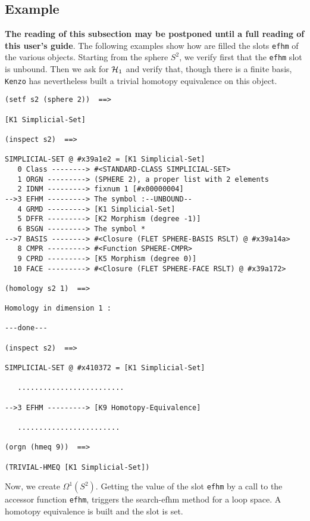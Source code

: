 \subsection*{Example}

{\bf The reading of this subsection may be postponed until a full reading of this user's guide}.
The following examples  show how are
filled the slots {\tt efhm} of the various objects.
Starting from the sphere $S^2$, we  verify first that the {\tt efhm} slot is unbound.
Then we ask for ${\cal H}_1$ and verify that, though there is a finite basis,
{\tt Kenzo} has nevertheless built a trivial homotopy equivalence on this object.
{\footnotesize\begin{verbatim}
(setf s2 (sphere 2))  ==>

[K1 Simplicial-Set]

(inspect s2)  ==>

SIMPLICIAL-SET @ #x39a1e2 = [K1 Simplicial-Set]
   0 Class --------> #<STANDARD-CLASS SIMPLICIAL-SET>
   1 ORGN ---------> (SPHERE 2), a proper list with 2 elements
   2 IDNM ---------> fixnum 1 [#x00000004]
-->3 EFHM ---------> The symbol :--UNBOUND--
   4 GRMD ---------> [K1 Simplicial-Set]
   5 DFFR ---------> [K2 Morphism (degree -1)]
   6 BSGN ---------> The symbol *
-->7 BASIS --------> #<Closure (FLET SPHERE-BASIS RSLT) @ #x39a14a>
   8 CMPR ---------> #<Function SPHERE-CMPR>
   9 CPRD ---------> [K5 Morphism (degree 0)]
  10 FACE ---------> #<Closure (FLET SPHERE-FACE RSLT) @ #x39a172>

(homology s2 1)  ==>

Homology in dimension 1 :

---done---

(inspect s2)  ==>

SIMPLICIAL-SET @ #x410372 = [K1 Simplicial-Set]

   .........................

-->3 EFHM ---------> [K9 Homotopy-Equivalence]

   ........................

(orgn (hmeq 9))  ==>

(TRIVIAL-HMEQ [K1 Simplicial-Set])
\end{verbatim}}
Now, we create $\Omega^1(S^2)$. Getting  the value of the slot {\tt efhm}
by a call to the accessor function {\tt efhm}, triggers the
search-efhm method for a loop space. A homotopy equivalence is built and
the slot is set.
